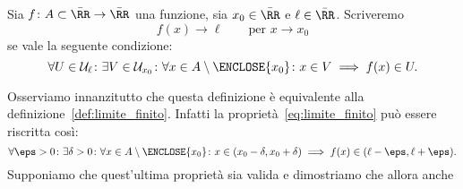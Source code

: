 \begin{definition}
  Sia $f\colon A\subset \bar \RR \to \bar \RR$ una funzione, 
  sia $x_0\in \bar \RR$ e $\ell\in \bar \RR$. 
  Scriveremo 
  \[
    f(x)\to \ell\qquad\text{per $x\to x_0$}
  \]
  se vale la seguente condizione:
  \begin{equation}\label{def:limite}
  \forall U\in \mathcal U_\ell\colon 
  \exists V\in \mathcal U_{x_0}\colon 
  \forall x\in A\setminus\ENCLOSE{x_0}\colon 
  x\in V \implies f(x) \in U.
  \end{equation}
\end{definition}

Osserviamo innanzitutto che questa definizione è equivalente 
alla definizione~\ref{def:limite_finito}.
Infatti la proprietà~\eqref{eq:limite_finito} può essere riscritta 
così:
\[
\forall \eps>0\colon \exists \delta>0\colon 
\forall x\in A\setminus\ENCLOSE{x_0}\colon 
 x \in (x_0-\delta,x_0+\delta) \implies f(x) \in (\ell-\eps,\ell+\eps).
\]
Supponiamo che quest'ultima proprietà sia valida e dimostriamo che allora 
anche 
